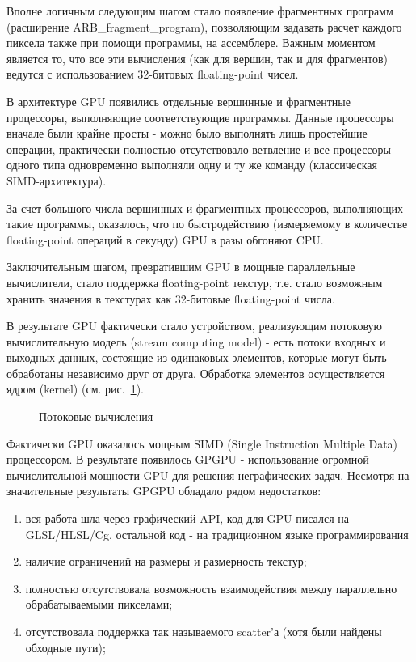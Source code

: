 Вполне логичным следующим шагом стало появление фрагментных программ (расширение ARB\_fragment\_program), позволяющим задавать расчет каждого пиксела также при помощи программы, на ассемблере. Важным моментом является то, что все эти вычисления (как для вершин, так и для фрагментов) ведутся с использованием 32-битовых floating-point чисел.

В архитектуре GPU появились отдельные вершинные и фрагментные процессоры, выполняющие соответствующие программы. Данные процессоры вначале были крайне просты - можно было выполнять лишь простейшие операции, практически полностью отсутствовало ветвление и все процессоры одного типа одновременно выполняли одну и ту же команду (классическая SIMD-архитектура).

За счет большого числа вершинных и фрагментных процессоров, выполняющих такие программы, оказалось, что по быстродействию (измеряемому в количестве floating-point операций в секунду) GPU в разы обгоняют CPU.

Заключительным шагом, превратившим GPU в мощные параллельные вычислители, стало поддержка floating-point текстур, т.е. стало возможным хранить значения в текстурах как 32-битовые floating-point числа.

В результате GPU фактически стало устройством, реализующим потоковую вычислительную модель (stream computing model) - есть потоки входных и выходных данных, состоящие из одинаковых элементов, которые могут быть обработаны независимо друг от друга. Обработка элементов осуществляется ядром (kernel) (см. рис.~\ref{gpu-programming-1}).
\begin{figure}[h]
\caption{Потоковые вычисления}
\label{gpu-programming-1}
\end{figure}

Фактически GPU оказалось мощным SIMD (Single Instruction Multiple Data) процессором. В результате появилось GPGPU - использование огромной вычислительной мощности GPU для решения неграфических задач. Несмотря на значительные результаты GPGPU обладало рядом недостатков:
\begin{enumerate}
\item вся работа шла через графический API, код для GPU писался на GLSL/HLSL/Cg, остальной код - на традиционном языке программирования
\item наличие ограничений на размеры и размерность текстур;
\item полностью отсутствовала возможность взаимодействия между параллельно обрабатываемыми пикселами;
\item отсутствовала поддержка так называемого scatter'а (хотя были найдены обходные пути);
\end{enumerate}

